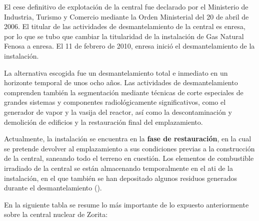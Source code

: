 El cese definitivo de explotación de la central fue declarado por el Ministerio de Industria, Turismo y Comercio mediante la Orden Ministerial del 20 de abril de 2006. El titular de las actividades de desmantelamiento de la central es \acrshort{enresa}, por lo que se tubo que cambiar la titularidad de la instalación de Gas Natural Fenosa a \acrshort{enresa}. El 11 de febrero de 2010, \acrshort{enresa} inició el desmantelamiento de la instalación.

La alternativa escogida fue un desmantelamiento total e inmediato en un horizonte temporal de unos ocho años. Las actividades de desmantelamiento comprenden también la segmentación mediante técnicas de corte especiales de grandes sistemas y componentes radiológicamente significativos, como el generador de vapor y la vasija del reactor, así como la descontaminación y demolición de edificios y la restauración final del emplazamiento. 

Actualmente, la instalación se encuentra en la \textbf{fase de restauración}, en la cual se pretende devolver al emplazamiento a sus condiciones previas a la construcción de la central, saneando todo el terreno en cuestión. Los elementos de combustible irradiado de la central se están almacenando temporalmente en el \acrfull{ati} de la instalación, en el que también se han depositado algunos residuos generados durante el desmantelamiento (\cite{enresa_desmantelamiento_zorita}).

En la siguiente tabla se resume lo más importante de lo expuesto anteriormente sobre la central nuclear de Zorita:

